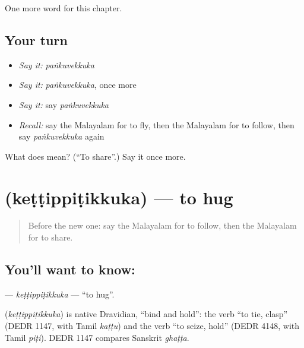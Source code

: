 \begin{grammarlens}[title={What you've built}]
One more word for this chapter.
\end{grammarlens}

\subsection*{Your turn}
\begin{itemize}
\raggedright
  \item \emph{Say it:} \emph{paṅkuvekkuka}
  \item \emph{Say it:} \emph{paṅkuvekkuka}, once more
  \item \emph{Say it:} say \emph{paṅkuvekkuka}
  \item \emph{Recall:} say the Malayalam for to fly, then the Malayalam for to follow, then say \emph{paṅkuvekkuka} again
\end{itemize}

\begin{tcolorbox}[breakable,colback=teal!4,colframe=teal!35!black,title={Before you move on}]
What does  mean? (\textquotedblleft{}To share\textquotedblright{}.) Say it once more.
\end{tcolorbox}
\section[\texorpdfstring{\ml{കെട്ടിപ്പിടിക്കുക} (keṭṭippiṭikkuka)}{കെട്ടിപ്പിടിക്കുക (keṭṭippiṭikkuka)}]{ (keṭṭippiṭikkuka) — to hug}

\label{lesson:ML-C186-kettippitikkuka}



\begin{quote}
Before the new one: say the Malayalam for to follow, then the Malayalam for to share.
\end{quote}

\subsection*{You'll want to know: }
\textbf{} — \emph{keṭṭippiṭikkuka} — \textquotedblleft{}to hug\textquotedblright{}.

\begin{cousinweb}
\textbf{} (\emph{keṭṭippiṭikkuka}) is native Dravidian, \textquotedblleft{}bind and hold\textquotedblright{}: the verb \textquotedblleft{}to tie, clasp\textquotedblright{} (DEDR 1147, with Tamil \emph{kaṭṭu}) and the verb \textquotedblleft{}to seize, hold\textquotedblright{} (DEDR 4148, with Tamil \emph{piṭi}). DEDR 1147 compares Sanskrit \emph{ghaṭṭa}.
\end{cousinweb}

